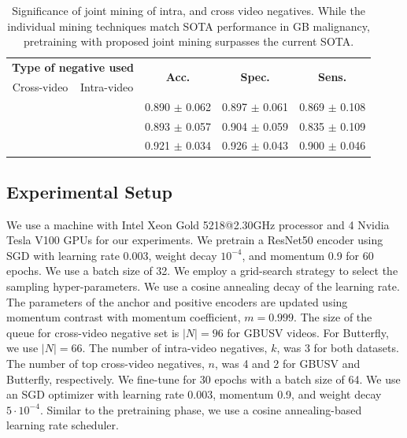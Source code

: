 \begin{table}[t]
	\centering
    \footnotesize
	\setlength{\tabcolsep}{10pt}
	\begin{tabular}{ccccc}
		\toprule
		\multicolumn{2}{c}{\textbf{Type of negative used}}& \multirow{2}{*}{\textbf{Acc.}} & \multirow{2}{*}{\textbf{Spec.}} & \multirow{2}{*}{\textbf{Sens.}} \\
		Cross-video & Intra-video & & & \\
		\midrule
		 \checkmark & & 0.890 $\pm$ 0.062 & 0.897 $\pm$ 0.061 & 0.869 $\pm$ 0.108 \\
		 & \checkmark & 0.893 $\pm$ 0.057 & 0.904 $\pm$ 0.059 & 0.835 $\pm$ 0.109 \\
		 \checkmark & \checkmark & 0.921 $\pm$ 0.034 & 0.926 $\pm$ 0.043 & 0.900 $\pm$ 0.046 \\
		\bottomrule
	\end{tabular}
    \caption[Quantitative validation of joint mining of intra, and cross video negative]{Significance of joint mining of intra, and cross video negatives. While the individual mining techniques match SOTA performance in GB malignancy, pretraining with proposed joint mining  surpasses the current SOTA.}
	\label{usucl_tab:ablation_intra_loss}
\end{table}
%
\subsection{Experimental Setup}
%
We use a machine with Intel Xeon Gold 5218@2.30GHz processor and 4 Nvidia Tesla V100 GPUs for our experiments. We pretrain a ResNet50 encoder using SGD with learning rate 0.003, weight decay $10^{-4}$, and momentum 0.9 for 60 epochs. We use a batch size of 32. We employ a grid-search strategy to select the sampling hyper-parameters. We use a cosine annealing decay of the learning rate. The parameters of the anchor and positive encoders are updated using momentum contrast with momentum coefficient, $m\!=\!0.999$. The size of the queue for cross-video negative set is $|N|\!=\!96$ for GBUSV videos. For Butterfly, we use $|N|\!=\!66$. The number of intra-video negatives, $k$, was 3 for both datasets. The number of top cross-video negatives, $n$, was 4 and 2 for GBUSV and Butterfly, respectively. We fine-tune for 30 epochs with a batch size of 64. We use an SGD optimizer with learning rate 0.003, momentum 0.9, and weight decay $5\!\cdot\!10^{-4}$. Similar to the pretraining phase, we use a cosine annealing-based learning rate scheduler. 

